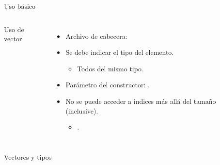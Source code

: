 \begin{frame}{Uso básico}
\vspace{-1.5em}
\begin{columns}[t]

\begin{block}{Uso de vector}

\end{block}

\begin{itemize}
  \item Archivo de cabecera: 

  \item Se debe indicar el tipo del elemento.
    \begin{itemize}
      \item Todos del mismo tipo.
    \end{itemize}

  \item Parámetro del constructor: .

  \item No se puede acceder a indices más allá del tamaño (inclusive).
    \begin{itemize}
      \item {}.
    \end{itemize}
\end{itemize}
\end{columns}
\end{frame}

\begin{frame}
\begin{block}{Vectores y tipos}

\end{block}
\end{frame}


